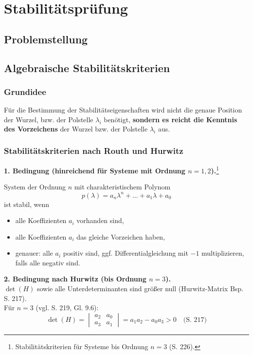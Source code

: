 \documentclass[12pt]{article}
\begin{document}
\clearpage
\section{Stabilitätsprüfung}

\subsection{Problemstellung}
\subsection{Algebraische Stabilitätskriterien}
\subsubsection{Grundidee}
Für die Bestimmung der Stabilitätseigenschaften wird nicht die genaue Position der Wurzel, bzw. der Polstelle \(\lambda_i\) benötigt, \textbf{sondern es reicht die Kenntnis des Vorzeichens} der Wurzel bzw. der Polstelle \(\lambda_i\) aus. 
\subsubsection{Stabilitätskriterien nach Routh und Hurwitz}
\noindent\textbf{1. Bedingung (hinreichend für Systeme mit Ordnung \(n=1,2\)).}\footnote{Stabilitätskriterien für Systeme bis Ordnung \(n=3\) (S. 226).} 

System der Ordnung \(n\) mit charakteristischem Polynom
\[
p(\lambda)=a_n\lambda^n+\dots+a_1\lambda+a_0
\]
ist stabil, wenn
\begin{itemize}
    \item alle Koeffizienten \(a_i\) vorhanden sind,
    \item alle Koeffizienten \(a_i\) das gleiche Vorzeichen haben,
    \item genauer: alle \(a_i\) positiv sind, ggf. Differentialgleichung mit \(-1\) multiplizieren, falls alle negativ sind.
\end{itemize}

\noindent\textbf{2. Bedingung nach Hurwitz (bis Ordnung \(n=3\)).}\\
\(\det(H)\) sowie alle Unterdeterminanten sind größer null (Hurwitz-Matrix Bsp. S. 217).\\
Für \(n=3\) (vgl. S. 219, Gl. 9.6):
\[
\det(H)=
\begin{vmatrix}
a_2 & a_0\\
a_3 & a_1
\end{vmatrix}
=a_1a_2-a_0a_3>0 \quad \text{(S. 217)}
\]
\end{document}
